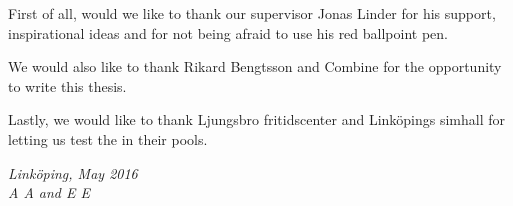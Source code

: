 \begin{acknowledgments}
First of all, would we like to thank our supervisor Jonas Linder for his support, inspirational ideas and for not being afraid to use his red ballpoint pen.

We would also like to thank Rikard Bengtsson and Combine for the opportunity to write this thesis.

Lastly, we would like to thank Ljungsbro fritidscenter and Linköpings simhall for letting us test the \abbrROV in their pools.

  \addvspace{1em}
  \begin{flushright}
    \textit{%
      Linköping, May 2016\\
      A A and E E%
    }
  \end{flushright}
\end{acknowledgments}